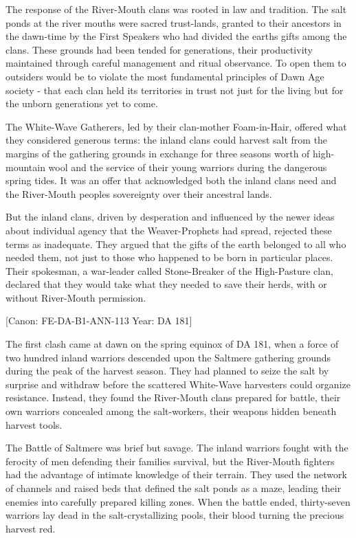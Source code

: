 The response of the River-Mouth clans was rooted in law and tradition.
The salt ponds at the river mouths were sacred trust-lands, granted to
their ancestors in the dawn-time by the First Speakers who had divided
the earth\textquotesingle s gifts among the clans. These grounds had
been tended for generations, their productivity maintained through
careful management and ritual observance. To open them to outsiders
would be to violate the most fundamental principles of Dawn Age society
- that each clan held its territories in trust not just for the living
but for the unborn generations yet to come.

The White-Wave Gatherers, led by their clan-mother Foam-in-Hair, offered
what they considered generous terms: the inland clans could harvest salt
from the margins of the gathering grounds in exchange for three
seasons\textquotesingle{} worth of high-mountain wool and the service of
their young warriors during the dangerous spring tides. It was an offer
that acknowledged both the inland clans\textquotesingle{} need and the
River-Mouth peoples\textquotesingle{} sovereignty over their ancestral
lands.

But the inland clans, driven by desperation and influenced by the newer
ideas about individual agency that the Weaver-Prophets had spread,
rejected these terms as inadequate. They argued that the gifts of the
earth belonged to all who needed them, not just to those who happened to
be born in particular places. Their spokesman, a war-leader called
Stone-Breaker of the High-Pasture clan, declared that they would take
what they needed to save their herds, with or without River-Mouth
permission.

{[}Canon: FE-DA-B1-ANN-113 \textbar{} Year: DA 181{]}

The first clash came at dawn on the spring equinox of DA 181, when a
force of two hundred inland warriors descended upon the Saltmere
gathering grounds during the peak of the harvest season. They had
planned to seize the salt by surprise and withdraw before the scattered
White-Wave harvesters could organize resistance. Instead, they found the
River-Mouth clans prepared for battle, their own warriors concealed
among the salt-workers, their weapons hidden beneath harvest tools.

The Battle of Saltmere was brief but savage. The inland warriors fought
with the ferocity of men defending their families\textquotesingle{}
survival, but the River-Mouth fighters had the advantage of intimate
knowledge of their terrain. They used the network of channels and raised
beds that defined the salt ponds as a maze, leading their enemies into
carefully prepared killing zones. When the battle ended, thirty-seven
warriors lay dead in the salt-crystallizing pools, their blood turning
the precious harvest red.

